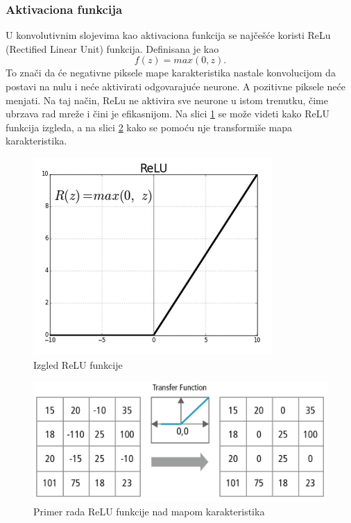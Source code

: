 \documentclass[a4paper]{article}
\begin{document}
\subsubsection{Aktivaciona funkcija}
\label{aktivaciona_funkcija}

U konvolutivnim slojevima kao aktivaciona funkcija se najčešće koristi ReLu (Rectified Linear Unit) funkcija. Definisana je kao $$ f(z) = max(0, z). $$ To znači da će negativne piksele mape karakteristika nastale konvolucijom da postavi na nulu i neće aktivirati odgovarajuće neurone. A pozitivne piksele neće menjati. Na taj način, ReLu ne aktivira sve neurone u istom trenutku, čime ubrzava rad mreže i čini je efikasnijom. Na slici \ref{fig:relu_fja} se može videti kako ReLU funkcija izgleda, a na slici \ref{fig:relu_transform} kako se pomoću nje transformiše mapa karakteristika.

\begin{figure}[h!]
\begin{center}
\includegraphics[scale=0.38]{relu2.png}
\end{center}
\caption{Izgled ReLU funkcije}
\label{fig:relu_fja}
\end{figure}


\begin{figure}[h!]
\begin{center}
\includegraphics[scale=0.20]{relu1.jpg}
\end{center}
\caption{Primer rada ReLU funkcije nad mapom karakteristika}
\label{fig:relu_transform}
\end{figure}
\end{document}
